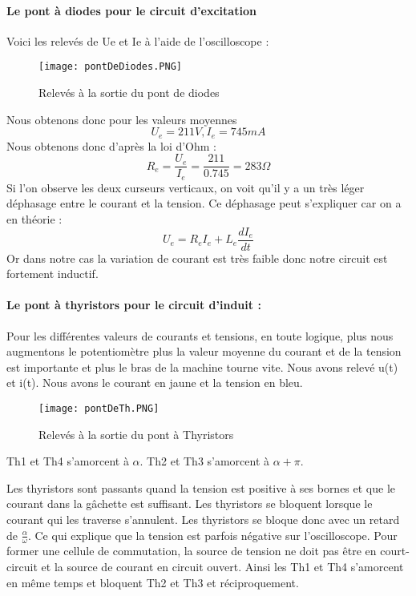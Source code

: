 \documentclass[oneside,a4paper,12pt]{article}
\begin{document}
	\paragraph{Le pont à diodes pour le circuit d'excitation}
	
	Voici les relevés de Ue et Ie à l’aide de l'oscilloscope : 
	
	\begin{figure}[h]
		\centering
		\texttt{[image: pontDeDiodes.PNG]}
		\caption{Relevés à la sortie du pont de diodes}
	\end{figure}
	\newpage
	Nous obtenons donc pour les valeurs moyennes 
	$$ U_{e}=211 V, I_{e}=745 mA $$
	Nous obtenons donc d’après la loi d’Ohm : 
	$$ R_{e}=\frac{U_{e}}{I_{e}}=\frac{211}{0.745}=283\Omega $$
	Si l’on observe les deux curseurs verticaux, on voit qu’il y a un très léger déphasage entre le courant et la tension.
	Ce déphasage peut s’expliquer car on a en théorie :  
	$$ U_{e}=R_{e}I_{e}+L_{e}\frac{dI_{e}}{dt} $$
	Or dans notre cas la variation de courant est très faible donc notre circuit est fortement inductif.
	
	\paragraph{Le pont à thyristors pour le circuit d’induit :}
	
	Pour les différentes valeurs de courants et tensions, en toute logique, plus nous augmentons le potentiomètre plus la valeur moyenne du courant et de la tension est importante et plus le bras de la machine tourne vite. 
	Nous avons relevé u(t) et i(t). Nous avons le courant en jaune et la tension en bleu. 
	
	\begin{figure}[h]
		\centering
		\texttt{[image: pontDeTh.PNG]}
		\caption{Relevés à la sortie du pont à Thyristors}
	\end{figure}

	Th1 et Th4 s’amorcent à $\alpha$. Th2 et Th3 s'amorcent à $\alpha+\pi$. 

	Les thyristors sont passants quand la tension est positive à ses bornes et que le courant dans la gâchette est suffisant.
	Les thyristors se bloquent lorsque le courant qui les traverse s’annulent. Les thyristors se bloque donc avec un retard de $\frac{\alpha}{\omega}$. Ce qui explique que la tension est parfois négative sur l'oscilloscope. Pour former une cellule de commutation, la source de tension ne doit pas être en court-circuit et la source de courant en circuit ouvert. Ainsi les Th1 et Th4 s’amorcent en même temps et bloquent Th2 et Th3 et réciproquement.
\end{document}
